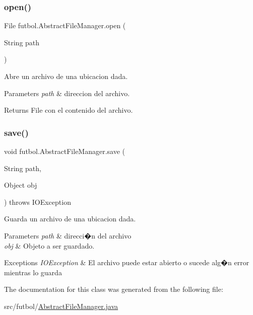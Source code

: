 \subsubsection{\texorpdfstring{open()}{open()}}
{\footnotesize\ttfamily File futbol.\+Abstract\+File\+Manager.\+open (\begin{DoxyParamCaption}\item[{String}]{path }\end{DoxyParamCaption})}

Abre un archivo de una ubicacion dada. 
\begin{DoxyParams}{Parameters}
{\em path} & direccion del archivo. \\
\hline
\end{DoxyParams}
\begin{DoxyReturn}{Returns}
File con el contenido del archivo. 
\end{DoxyReturn}
\hypertarget{classfutbol_1_1_abstract_file_manager_a60a0958e94d04adaf54568b3f4a959a2}{}\label{classfutbol_1_1_abstract_file_manager_a60a0958e94d04adaf54568b3f4a959a2} 
\subsubsection{\texorpdfstring{save()}{save()}}
{\footnotesize\ttfamily void futbol.\+Abstract\+File\+Manager.\+save (\begin{DoxyParamCaption}\item[{String}]{path,  }\item[{Object}]{obj }\end{DoxyParamCaption}) throws I\+O\+Exception}

Guarda un archivo de una ubicacion dada. 
\begin{DoxyParams}{Parameters}
{\em path} & direcci�n del archivo \\
\hline
{\em obj} & Objeto a ser guardado. \\
\hline
\end{DoxyParams}

\begin{DoxyExceptions}{Exceptions}
{\em I\+O\+Exception} & El archivo puede estar abierto o sucede alg�n error mientras lo guarda \\
\hline
\end{DoxyExceptions}


The documentation for this class was generated from the following file\+:\begin{DoxyCompactItemize}
\item 
src/futbol/\hyperlink{_abstract_file_manager_8java}{Abstract\+File\+Manager.\+java}\end{DoxyCompactItemize}
